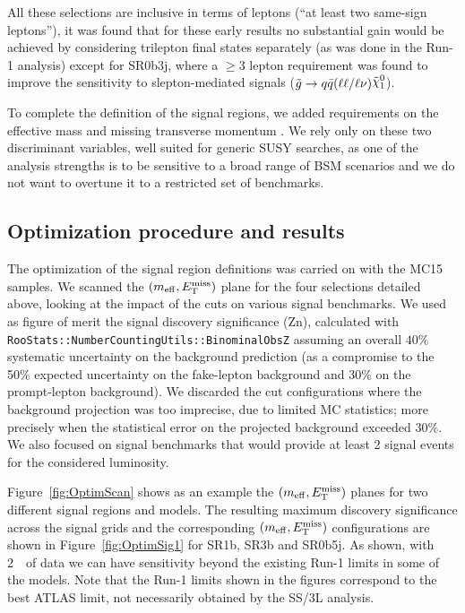 All these selections are inclusive in terms of leptons (``at least two same-sign leptons''), 
it was found that for these early results no substantial gain would be achieved by considering trilepton final states separately (as was done in the Run-1 analysis) except for SR0b3j, where a $\geq$3 lepton requirement was found to improve the sensitivity to slepton-mediated signals ($\gluino\to q\bar{q}(\ell\ell/\ell\nu)\ninoone$).

To complete the definition of the signal regions, we added requirements on the effective mass \meff{} and missing transverse momentum \met. 
We rely only on these two discriminant variables, well suited for generic SUSY searches, 
as one of the analysis strengths is to be sensitive to a broad range of BSM scenarios and we do not want to overtune it to a restricted set of benchmarks. 

\subsection{Optimization procedure and results}

The optimization of the signal region definitions was carried on with the MC15 samples. %
We scanned the $(m_{\mathrm{eff}},E_{\mathrm{T}}^{\mathrm{miss}})$ plane for the four selections detailed above, 
looking at the impact of the cuts on various signal benchmarks. 
We used as figure of merit the signal discovery significance (Zn), calculated with {\tt RooStats::NumberCountingUtils::BinominalObsZ} 
assuming an overall $40\%$ systematic uncertainty on the background prediction (as a compromise to the 50\% expected uncertainty on the fake-lepton background and 30\% on the prompt-lepton background). 
We discarded the cut configurations where the background projection was too imprecise, due to limited MC statistics; 
more precisely when the statistical error on the projected background exceeded $30\%$. 
We also focused on signal benchmarks that would provide at least 2 signal events for the considered luminosity. 

Figure~\ref{fig:OptimScan} shows as an example the $(m_{\mathrm{eff}}, E_{\mathrm{T}}^{\mathrm{miss}})$ planes for two different signal regions and models.
The resulting maximum discovery significance across the signal grids and the corresponding $(m_{\mathrm{eff}},E_{\mathrm{T}}^{\mathrm{miss}})$ configurations 
are shown in Figure~\ref{fig:OptimSig1} for SR1b, SR3b and SR0b5j. As shown, with 2~\ifb\ of data we can have sensitivity beyond the existing Run-1 limits in some of the models. Note that the Run-1 limits shown in the figures correspond to the best ATLAS limit, not necessarily obtained by the SS/3L analysis.

